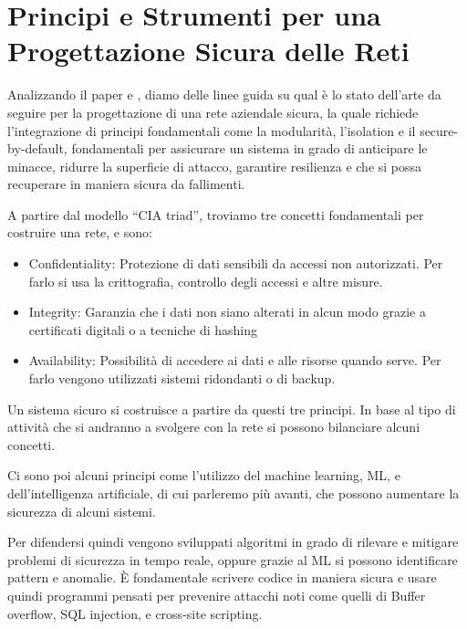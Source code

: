    \section{Principi e Strumenti per una Progettazione Sicura delle Reti}
            Analizzando il paper \cite{Design_Principles_Secure_Systems} e \cite{Advanced_Networking_Cybersecurity_Approaches}, diamo delle linee guida su qual è lo stato dell'arte da seguire per la progettazione di una rete aziendale sicura, la quale richiede l'integrazione di principi fondamentali come la modularità, l'isolation e il secure-by-default, fondamentali per assicurare un sistema in grado di anticipare le minacce, ridurre la superficie di attacco, garantire resilienza e che si possa recuperare in maniera sicura da fallimenti.

            A partire dal modello “CIA triad”, troviamo tre concetti fondamentali per costruire una rete, e sono: 
            \begin{itemize}
                \item Confidentiality: Protezione di dati sensibili da accessi non autorizzati. Per farlo si usa la crittografia, controllo degli accessi e altre misure.
                \item Integrity: Garanzia che i dati non siano alterati in alcun modo grazie a certificati digitali o a tecniche di hashing
                \item Availability: Possibilità di accedere ai dati e alle risorse quando serve. Per farlo vengono utilizzati sistemi ridondanti o di backup.
            \end{itemize}

            Un sistema sicuro si costruisce a partire da questi tre principi. In base al tipo di attività che si andranno a svolgere con la rete si possono bilanciare alcuni concetti.

            Ci sono poi alcuni principi come l'utilizzo del machine learning, ML, e dell'intelligenza artificiale, di cui parleremo più avanti, che possono aumentare la sicurezza di alcuni sistemi.

            Per difendersi quindi vengono sviluppati algoritmi in grado di rilevare e mitigare problemi di sicurezza in tempo reale, oppure grazie al ML si possono identificare pattern e anomalie.
            È fondamentale scrivere codice in maniera sicura e usare quindi programmi pensati per prevenire attacchi noti come quelli di Buffer overflow, SQL injection, e cross-site scripting.

